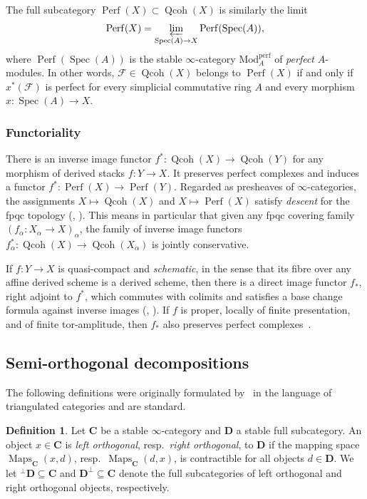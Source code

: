 \documentclass[11pt]{article}
\theoremstyle{definition}
\newtheorem{defi}[theo]{Definition}
\numberwithin{equation}{section}
\numberwithin{figure}{section}
\numberwithin{table}{section}
\newcommand{\sF}{\ensuremath{\mathcal{F}}\xspace}
\newcommand{\bC}{\ensuremath{\mathbf{C}}\xspace}
\newcommand{\bD}{\ensuremath{\mathbf{D}}\xspace}
\renewcommand{\lim}{\varprojlim}
\newcommand{\Mod}{\mrm{Mod}}
\newcommand{\perf}{{\mrm{perf}}}
\DeclareMathOperator{\Maps}{Maps}
\DeclareMathOperator{\Spec}{Spec}
\DeclareMathOperator{\Qcoh}{Qcoh}
\DeclareMathOperator{\Perf}{Perf}
\newcommand{\mrm}[1]{\ensuremath{\mathrm{#1}}\xspace}
\begin{document}
The full subcategory $\Perf(X) \subset \Qcoh(X)$ is similarly the limit
\[
\Perf(X) = \lim_{\Spec(A) \to X} \Perf(\Spec(A)),
\]
where $\Perf(\Spec(A))$ is the stable $\infty$-category $\Mod_A^\perf$ of \emph{perfect} $A$-modules. In other words, $\sF \in \Qcoh(X)$ belongs to $\Perf(X)$ if and only if $x^*(\sF)$ is perfect for every simplicial commutative ring $A$ and every morphism $x : \Spec(A) \to X$.

\subsubsection{Functoriality}\label{sssec:Qcoh functoriality}

There is an inverse image functor $f^* : \Qcoh(X) \to \Qcoh(Y)$ for any morphism of derived stacks $f : Y \to X$. It preserves perfect complexes and induces a functor $f^* : \Perf(X) \to \Perf(Y)$. Regarded as presheaves of $\infty$-categories, the assignments $X \mapsto \Qcoh(X)$ and $X \mapsto \Perf(X)$ satisfy \emph{descent} for the fpqc topology (\cite[Corollary~D.6.3.3]{SAG-20180204}, \cite[Theorem~1.3.4]{GaitsgoryRozenblyum}). This means in particular that given any fpqc covering family $(f_\alpha : X_\alpha \to X)_\alpha$, the family of inverse image functors $f_\alpha^* : \Qcoh(X) \to \Qcoh(X_\alpha)$ is jointly conservative.

If $f : Y \to X$ is quasi-compact and \emph{schematic}, in the sense that its fibre over any affine derived scheme is a derived scheme, then there is a direct image functor $f_*$, right adjoint to $f^*$, which commutes with colimits and satisfies a base change formula against inverse images (\cite[Proposition~2.5.4.5]{SAG-20180204}, \cite[Volume~1, Chapter~3, Proposition~2.2.2]{GaitsgoryRozenblyum}). If $f$ is proper, locally of finite presentation, and of finite tor-amplitude, then $f_*$ also preserves perfect complexes~\cite[Theorem~6.1.3.2]{SAG-20180204}.

\subsection{Semi-orthogonal decompositions}

The following definitions were originally formulated by~\cite{BondalKapranov} in the language of triangulated categories and are standard.

\begin{defi}
Let $\bC$ be a stable $\infty$-category and $\bD$ a stable full subcategory. An object $x \in \bC$ is \emph{left orthogonal}, resp.~\emph{right orthogonal}, to $\bD$ if the mapping space $\Maps_\bC(x,d)$, resp.~$\Maps_\bC(d,x)$, is contractible for all objects $d\in\bD$. We let $^\perp\bD \subseteq \bC$ and $\bD^\perp \subseteq \bC$ denote the full subcategories of left orthogonal and right orthogonal objects, respectively.
\end{defi}
\end{document}

